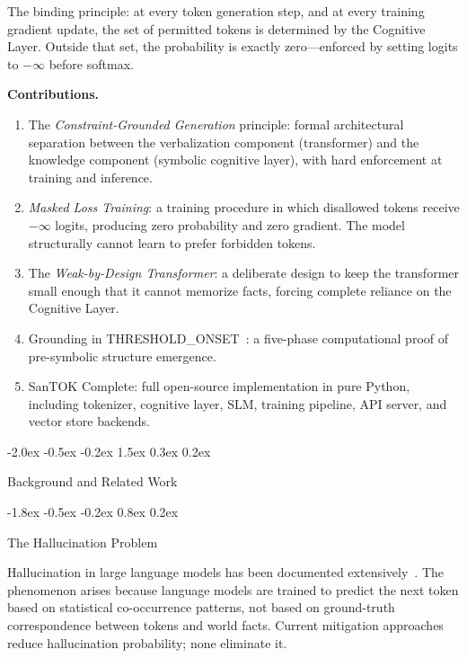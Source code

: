 \documentclass[10pt]{article}
\makeatletter
\renewcommand{\section}{\@startsection{section}{1}{\z@}%
  {-2.0ex \@plus -0.5ex \@minus -0.2ex}%
  {1.5ex \@plus 0.3ex \@minus 0.2ex}%
  {\large\bfseries\raggedright}}
\renewcommand{\subsection}{\@startsection{subsection}{2}{\z@}%
  {-1.8ex \@plus -0.5ex \@minus -0.2ex}%
  {0.8ex \@plus 0.2ex}%
  {\normalsize\bfseries\raggedright}}
\makeatother
\begin{document}
The binding principle: at every token generation step, and at every training gradient
update, the set of permitted tokens is determined by the Cognitive Layer. Outside that
set, the probability is exactly zero---enforced by setting logits to $-\infty$ before
softmax.

\textbf{Contributions.}
\begin{enumerate}
  \item The \emph{Constraint-Grounded Generation} principle: formal architectural
        separation between the verbalization component (transformer) and the knowledge
        component (symbolic cognitive layer), with hard enforcement at training and
        inference.
  \item \emph{Masked Loss Training}: a training procedure in which disallowed tokens
        receive $-\infty$ logits, producing zero probability and zero gradient. The
        model structurally cannot learn to prefer forbidden tokens.
  \item The \emph{Weak-by-Design Transformer}: a deliberate design to keep the
        transformer small enough that it cannot memorize facts, forcing complete
        reliance on the Cognitive Layer.
  \item Grounding in THRESHOLD\_ONSET~\cite{chavala2026threshold}: a five-phase
        computational proof of pre-symbolic structure emergence.
  \item SanTOK Complete: full open-source implementation in pure Python, including
        tokenizer, cognitive layer, SLM, training pipeline, API server, and vector
        store backends.
\end{enumerate}

\section{Background and Related Work}

\subsection{The Hallucination Problem}

Hallucination in large language models has been documented
extensively~\cite{ji2023survey}. The phenomenon arises because language models are
trained to predict the next token based on statistical co-occurrence patterns, not based
on ground-truth correspondence between tokens and world facts. Current mitigation
approaches reduce hallucination probability; none eliminate it.
\end{document}
